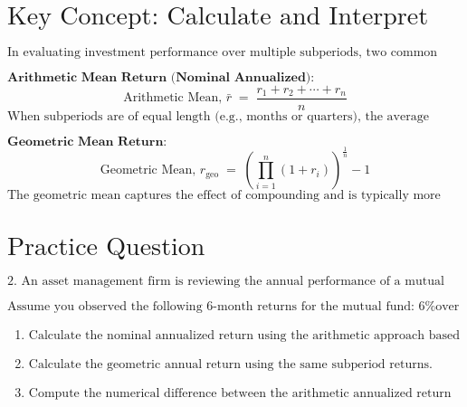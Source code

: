\section*{\(\text{Key Concept: Calculate and Interpret Different Approaches to Return Measurement Over Time and Describe Their Appropriate Uses}\)}

\(\text{In evaluating investment performance over multiple subperiods, two common methods for computing returns are the arithmetic mean return and the geometric mean return.}\)

\(\textbf{Arithmetic Mean Return (Nominal Annualized):}\)
\[
\text{Arithmetic Mean, } \bar{r} \;=\;\frac{r_{1}+r_{2}+\cdots+r_{n}}{n}
\]
\(\text{When subperiods are of equal length (e.g., months or quarters), the average subperiod return can be multiplied appropriately to annualize it.}\)

\(\textbf{Geometric Mean Return:}\)
\[
\text{Geometric Mean, } r_{\text{geo}} \;=\;\left(\prod_{i=1}^{n}(1+r_{i})\right)^{\frac{1}{n}}-1
\]
\(\text{The geometric mean captures the effect of compounding and is typically more appropriate for multi-period investment evaluations.}\)

\section*{\(\text{Practice Question}\)}
\(\text{2. An asset management firm is reviewing the annual performance of a mutual fund that experienced several mid-year dividend reinvestments and periodic external cash flows. Candidates are asked to compute the nominal annualized return using simple arithmetic returns, adjust these for compounding effects to determine geometric returns, and interpret the differences between these approaches.}\)

\(\text{Assume you observed the following 6-month returns for the mutual fund: 6\% over the first half of the year and 10\% over the second half of the year.}\)

\begin{enumerate}
\item \(\text{Calculate the nominal annualized return using the arithmetic approach based on these two subperiod returns.}\)
\item \(\text{Calculate the geometric annual return using the same subperiod returns.}\)
\item \(\text{Compute the numerical difference between the arithmetic annualized return and the geometric annual return.}\)
\end{enumerate}

